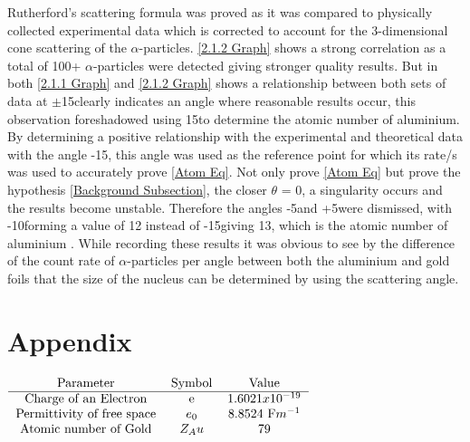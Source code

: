 \documentclass[12pt]{article}
\begin{document}
Rutherford's scattering formula was proved as it was compared to physically collected experimental data which is corrected to account for the 3-dimensional cone scattering of the $\alpha$-particles. \cref{2.1.2 Graph} shows a strong correlation as a total of 100+ $\alpha$-particles were detected giving stronger quality results. But in both \cref{2.1.1 Graph} and \cref{2.1.2 Graph} shows a relationship between both sets of data at $\pm$15\textdegree clearly indicates an angle where reasonable results occur, this observation foreshadowed using 15\textdegree to determine the atomic number of aluminium. \\

By determining a positive relationship with the experimental and theoretical data with the angle -15\textdegree, this angle was used as the reference point for which its rate/s was used to accurately prove \cref{Atom Eq}. Not only prove \cref{Atom Eq} but prove the hypothesis \cref{Background Subsection}, the closer $\theta$ = 0, a singularity occurs and the results become unstable. Therefore the angles -5\textdegree and +5\textdegree were dismissed, with -10\textdegree forming a value of 12 instead of -15\textdegree giving 13, which is the atomic number of aluminium \cite{CRC}. While recording these results it was obvious to see by the difference of the count rate of $\alpha$-particles per angle between both the aluminium and gold foils that the size of the nucleus can be determined by using the scattering angle.

\section{Appendix}
\label{Appendix Section}

\begin{table}[H]
\begin{center}
 \begin{math}
 \begin{tabular}{c c c}
 Parameter & Symbol & Value \\ 
 \hline
 Charge of an Electron & e & $1.6021x10^{-19}$ \\
 Permittivity of free space & $e_0$ & 8.8524 F$m^{-1}$ \\
 Atomic number of Gold & $Z_Au$ & 79 \\
 \end{tabular}
 \end{math}
 \caption{Useful Constants.\cite{Exp.6-2019}}
 \label{Useful Constants}
\end{center}
\end{table}
\end{document}
